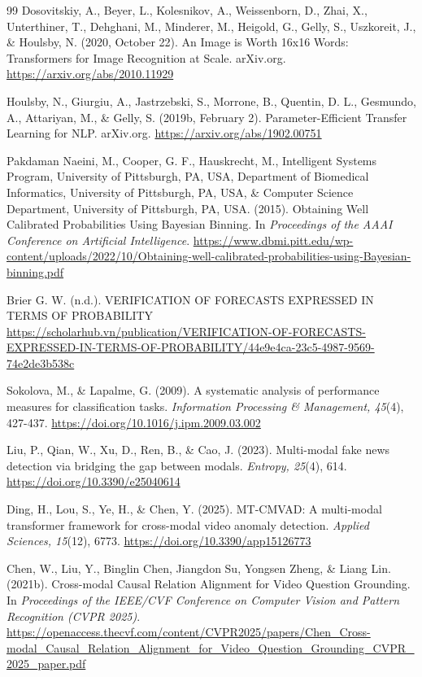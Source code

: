 \begin{thebibliography}{99}
Dosovitskiy, A., Beyer, L., Kolesnikov, A., Weissenborn, D., Zhai, X., Unterthiner, T., Dehghani, M., Minderer, M., Heigold, G., Gelly, S., Uszkoreit, J., \& Houlsby, N. (2020, October 22). An Image is Worth 16x16 Words: Transformers for Image Recognition at Scale. arXiv.org. \url{https://arxiv.org/abs/2010.11929}

Houlsby, N., Giurgiu, A., Jastrzebski, S., Morrone, B., Quentin, D. L., Gesmundo, A., Attariyan, M., \& Gelly, S. (2019b, February 2). Parameter-Efficient Transfer Learning for NLP. arXiv.org. \url{https://arxiv.org/abs/1902.00751}

Pakdaman Naeini, M., Cooper, G. F., Hauskrecht, M., Intelligent Systems Program, University of Pittsburgh, PA, USA, Department of Biomedical Informatics, University of Pittsburgh, PA, USA, \& Computer Science Department, University of Pittsburgh, PA, USA. (2015). Obtaining Well Calibrated Probabilities Using Bayesian Binning. In \textit{Proceedings of the AAAI Conference on Artificial Intelligence}. \url{https://www.dbmi.pitt.edu/wp-content/uploads/2022/10/Obtaining-well-calibrated-probabilities-using-Bayesian-binning.pdf}

Brier G. W. (n.d.). VERIFICATION OF FORECASTS EXPRESSED IN TERMS OF PROBABILITY \url{https://scholarhub.vn/publication/VERIFICATION-OF-FORECASTS-EXPRESSED-IN-TERMS-OF-PROBABILITY/44e9e4ca-23c5-4987-9569-74e2de3b538c}

Sokolova, M., \& Lapalme, G. (2009). A systematic analysis of performance measures for classification tasks. \textit{Information Processing \& Management, 45}(4), 427-437. \url{https://doi.org/10.1016/j.ipm.2009.03.002}

Liu, P., Qian, W., Xu, D., Ren, B., \& Cao, J. (2023). Multi-modal fake news detection via bridging the gap between modals. \textit{Entropy, 25}(4), 614. \url{https://doi.org/10.3390/e25040614}

Ding, H., Lou, S., Ye, H., \& Chen, Y. (2025). MT-CMVAD: A multi-modal transformer framework for cross-modal video anomaly detection. \textit{Applied Sciences, 15}(12), 6773. \url{https://doi.org/10.3390/app15126773}

Chen, W., Liu, Y., Binglin Chen, Jiangdon Su, Yongsen Zheng, \& Liang Lin. (2021b). Cross-modal Causal Relation Alignment for Video Question Grounding. In \textit{Proceedings of the IEEE/CVF Conference on Computer Vision and Pattern Recognition (CVPR 2025)}. \url{https://openaccess.thecvf.com/content/CVPR2025/papers/Chen_Cross-modal_Causal_Relation_Alignment_for_Video_Question_Grounding_CVPR_2025_paper.pdf}


\end{thebibliography}
